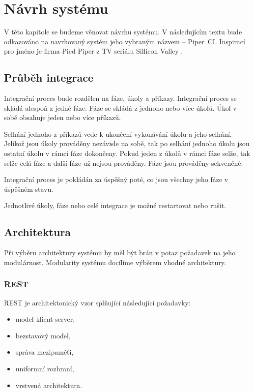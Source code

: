 \chapter{Návrh systému}

V této kapitole se budeme věnovat návrhu systému.
V následujícím textu bude odkazováno na navrhovaný systém jeho vybraným názvem -- Piper~CI.
Inspirací pro jméno je firma Pied Piper z TV seriálu Sillicon Valley \cite{pied_piper}.

\section{Průběh integrace}

Integrační proces bude rozdělen na fáze, úkoly a příkazy.
Integrační proces se skládá alespoň z jedné fáze.
Fáze se skládá z jednoho nebo více úkolů.
Úkol v sobě obsahuje jeden nebo více příkazů.

Selhání jednoho z příkazů vede k ukončení vykonávání úkolu a jeho selhání.
Jelikož jsou úkoly prováděny nezávisle na sobě, tak po selhání jednoho úkolu jsou ostatní úkolu v rámci fáze dokončeny.
Pokud jeden z úkolů v rámci fáze selže, tak selže celá fáze a další fáze už nejsou prováděny.
Fáze jsou prováděny sekvenčně.

Integrační proces je pokládán za úspěšný poté, co jsou všechny jeho fáze v úspěšném stavu.

Jednotlivé úkoly, fáze nebo celé integrace je možné restartovat nebo rušit.

\section{Architektura}

Při výběru architektury systému by měl být brán v potaz požadavek na jeho modulárnost.
Modularity systému docílíme výběrem vhodné architektury.

\subsection{REST}

REST je architektonický vzor splňující následující požadavky:

\begin{itemize}
    \item model klient-server,
    \item bezstavový model,
    \item správa mezipaměťi,
    \item uniformní rozhraní,
    \item vrstvená architektura.
\end{itemize}

